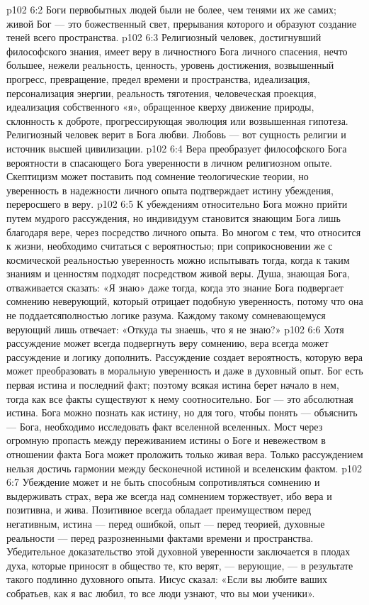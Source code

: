 \vs p102 6:2 Боги первобытных людей были не более, чем тенями их же самих; живой Бог --- это божественный свет, прерывания которого и образуют создание теней всего пространства.
\vs p102 6:3 \pc Религиозный человек, достигнувший философского знания, имеет веру в личностного Бога личного спасения, нечто большее, нежели реальность, ценность, уровень достижения, возвышенный прогресс, превращение, предел времени и пространства, идеализация, персонализация энергии, реальность тяготения, человеческая проекция, идеализация собственного «я», обращенное кверху движение природы, склонность к доброте, прогрессирующая эволюция или возвышенная гипотеза. Религиозный человек верит в Бога любви. Любовь --- вот сущность религии и источник высшей цивилизации.
\vs p102 6:4 Вера преобразует философского Бога вероятности в спасающего Бога уверенности в личном религиозном опыте. Скептицизм может поставить под сомнение теологические теории, но уверенность в надежности личного опыта подтверждает истину убеждения, переросшего в веру.
\vs p102 6:5 К убеждениям относительно Бога можно прийти путем мудрого рассуждения, но индивидуум становится знающим Бога лишь благодаря вере, через посредство личного опыта. Во многом с тем, что относится к жизни, необходимо считаться с вероятностью; при соприкосновении же с космической реальностью уверенность можно испытывать тогда, когда к таким знаниям и ценностям подходят посредством живой веры. Душа, знающая Бога, отваживается сказать: «Я знаю» даже тогда, когда это знание Бога подвергает сомнению неверующий, который отрицает подобную уверенность, потому что она не поддаетсяполностью логике разума. Каждому такому сомневающемуся верующий лишь отвечает: «Откуда ты знаешь, что я не знаю?»
\vs p102 6:6 \pc Хотя рассуждение может всегда подвергнуть веру сомнению, вера всегда может рассуждение и логику дополнить. Рассуждение создает вероятность, которую вера может преобразовать в моральную уверенность и даже в духовный опыт. Бог есть первая истина и последний факт; поэтому всякая истина берет начало в нем, тогда как все факты существуют к нему соотносительно. Бог --- это абсолютная истина. Бога можно познать как истину, но для того, чтобы понять --- объяснить --- Бога, необходимо исследовать факт вселенной вселенных. Мост через огромную пропасть между переживанием истины о Боге и невежеством в отношении факта Бога может проложить только живая вера. Только рассуждением нельзя достичь гармонии между бесконечной истиной и вселенским фактом.
\vs p102 6:7 Убеждение может и не быть способным сопротивляться сомнению и выдерживать страх, вера же всегда над сомнением торжествует, ибо вера и позитивна, и жива. Позитивное всегда обладает преимуществом перед негативным, истина --- перед ошибкой, опыт --- перед теорией, духовные реальности --- перед разрозненными фактами времени и пространства. Убедительное доказательство этой духовной уверенности заключается в плодах духа, которые приносят в общество те, кто верят, --- верующие, --- в результате такого подлинно духовного опыта. Иисус сказал: «Если вы любите ваших собратьев, как я вас любил, то все люди узнают, что вы мои ученики».
